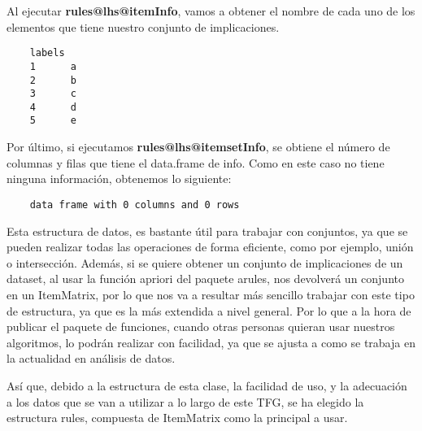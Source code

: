 \clearpage

Al ejecutar \textbf{rules@lhs@itemInfo}, vamos a obtener el nombre de cada uno de los elementos que 
tiene nuestro conjunto de implicaciones. 

\begin{verbatim}
    labels
    1      a
    2      b
    3      c
    4      d
    5      e
\end{verbatim}


Por \'ultimo, si ejecutamos \textbf{rules@lhs@itemsetInfo}, se obtiene el n\'umero de columnas y filas 
que tiene el data.frame de info. 
Como en este caso no tiene ninguna informaci\'on, obtenemos lo siguiente:
\begin{verbatim}
    data frame with 0 columns and 0 rows
\end{verbatim}


Esta estructura de datos, es bastante \'util para trabajar con conjuntos, ya que se pueden 
realizar todas las operaciones de forma eficiente, como por ejemplo, uni\'on o intersecci\'on.
Adem\'as, si se quiere obtener un conjunto de implicaciones de un dataset, al usar la funci\'on 
apriori del paquete arules, nos devolver\'a un conjunto en un ItemMatrix, por lo que nos va a 
resultar m\'as sencillo trabajar con este tipo de estructura, ya que es la m\'as 
extendida a nivel general. Por lo que a la hora de publicar el paquete de funciones, cuando otras 
personas quieran usar nuestros algoritmos, lo podr\'an realizar con facilidad, ya que se ajusta 
a como se trabaja en la actualidad en an\'alisis de datos.

As\'i que, debido a la estructura de esta clase, la facilidad de uso, y la adecuaci\'on a 
los datos que se van a utilizar a lo largo de este TFG, se ha elegido la estructura rules, compuesta de ItemMatrix 
como la principal a usar.

